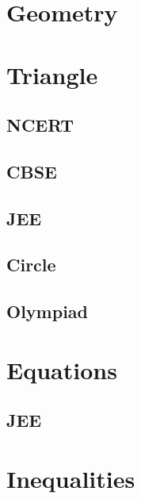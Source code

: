 \documentclass[journal]{IEEEtran}
\begin{document}
\newpage


\tableofcontents

\newpage
\onecolumn


\renewcommand{\thetable}{\theenumi}

\section{Geometry}

\section{Triangle}
\subsection{NCERT}

\subsection{CBSE}

\subsection{JEE}
 
\subsection{Circle}

\subsection{Olympiad}

\section{Equations}
\subsection{JEE}
 
\section{Inequalities}

\end{document}

